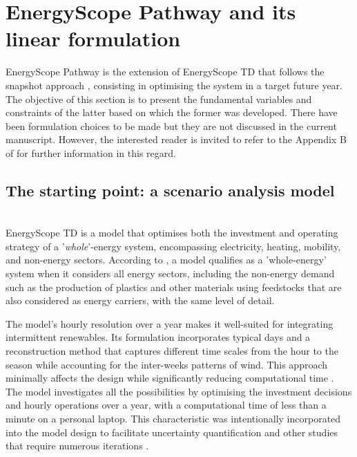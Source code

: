 \section{EnergyScope Pathway and its linear formulation} 
\label{app:ESPathway_full_formulation}

EnergyScope Pathway is the extension of EnergyScope TD \cite{limpens2019energyscope} that follows the snapshot approach \cite{Girones2015}, consisting in optimising the system in a target future year. The objective of this section is to present the fundamental variables and constraints of the latter based on which the former was developed. There have been formulation choices to be made but they are not discussed in the current manuscript. However, the interested reader is invited to refer to the Appendix B of \cite{limpens2024pathway} for further information in this regard.

\subsection{The starting point: a scenario analysis model}
\label{app:ESTD}

\\

\noindent
EnergyScope TD \cite{limpens2019energyscope} is a model that optimises both the investment and operating strategy of a '\emph{whole}'-energy system, encompassing electricity, heating, mobility, and non-energy sectors. According to \citet{contino2020whole}, a model qualifies as a 'whole-energy' system when it considers all energy sectors, including the non-energy demand such as the production of plastics and other materials using feedstocks that are also considered as energy carriers, with the same level of detail.

The model's hourly resolution over a year makes it well-suited for integrating intermittent renewables. Its formulation incorporates typical days and a reconstruction method that captures different time scales from the hour to the season while accounting for the inter-weeks patterns of wind. This approach minimally affects the design while significantly reducing computational time \cite{thiran2023validation}. The model investigates all the possibilities by optimising the investment decisions and hourly operations over a year, with a computational time of less than a minute on a personal laptop. This characteristic was intentionally incorporated into the model design to facilitate uncertainty quantification and other studies that require numerous iterations \cite{rixhon2021role}.

